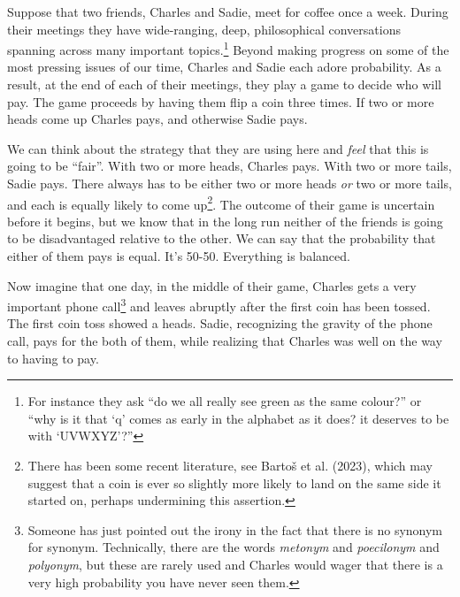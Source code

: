 \documentclass[
  letterpaper,
  DIV=11,
  numbers=noendperiod]{scrreprt}
\theoremstyle{definition}
\theoremstyle{definition}
\theoremstyle{definition}
\theoremstyle{remark}
\begin{document}
Suppose that two friends, Charles and Sadie, meet for coffee once a
week. During their meetings they have wide-ranging, deep, philosophical
conversations spanning across many important topics.\footnote{For
  instance they ask ``do we all really see green as the same colour?''
  or ``why is it that `q' comes as early in the alphabet as it does? it
  deserves to be with `UVWXYZ'?''} Beyond making progress on some of the
most pressing issues of our time, Charles and Sadie each adore
probability. As a result, at the end of each of their meetings, they
play a game to decide who will pay. The game proceeds by having them
flip a coin three times. If two or more heads come up Charles pays, and
otherwise Sadie pays.

We can think about the strategy that they are using here and \emph{feel}
that this is going to be ``fair''. With two or more heads, Charles pays.
With two or more tails, Sadie pays. There always has to be either two or
more heads \emph{or} two or more tails, and each is equally likely to
come up\footnote{There has been some recent literature, see Bartoš et
  al. (2023), which may suggest that a coin is ever so slightly more
  likely to land on the same side it started on, perhaps undermining
  this assertion.}. The outcome of their game is uncertain before it
begins, but we know that in the long run neither of the friends is going
to be disadvantaged relative to the other. We can say that the
probability that either of them pays is equal. It's 50-50. Everything is
balanced.

Now imagine that one day, in the middle of their game, Charles gets a
very important phone call\footnote{Someone has just pointed out the
  irony in the fact that there is no synonym for synonym. Technically,
  there are the words \emph{metonym} and \emph{poecilonym} and
  \emph{polyonym}, but these are rarely used and Charles would wager
  that there is a very high probability you have never seen them.} and
leaves abruptly after the first coin has been tossed. The first coin
toss showed a heads. Sadie, recognizing the gravity of the phone call,
pays for the both of them, while realizing that Charles was well on the
way to having to pay.
\end{document}
